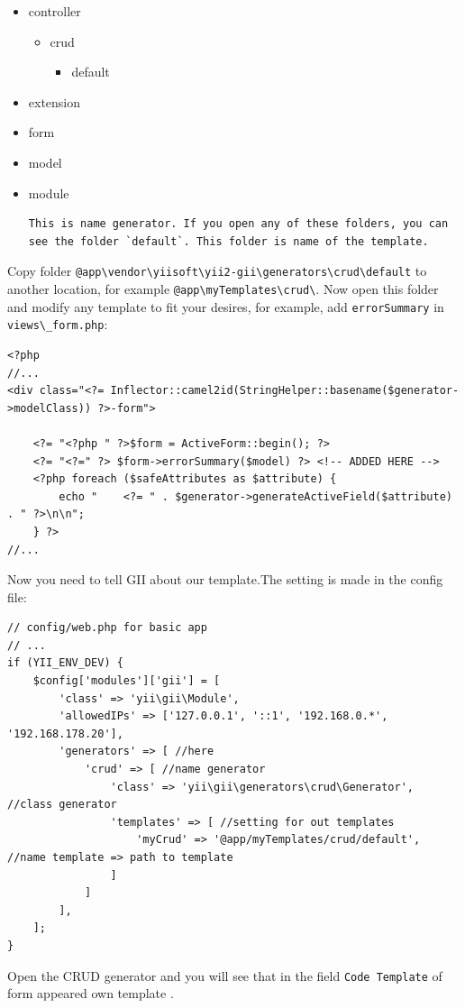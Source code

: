 \begin{itemize}
\item controller\begin{itemize}
\item crud\begin{itemize}
\item default
\end{itemize}

\end{itemize}

\item extension
\item form
\item model
\item module\begin{lstlisting}
This is name generator. If you open any of these folders, you can see the folder `default`. This folder is name of the template.
\end{lstlisting}

\end{itemize}
Copy folder \lstinline|@app\vendor\yiisoft\yii2-gii\generators\crud\default| to another location, for example \lstinline|@app\myTemplates\crud\|.
Now open this folder and modify any template to fit your desires, for example, add \lstinline|errorSummary| in \lstinline|views\_form.php|:

\lstset{language=php}\begin{lstlisting}
<?php
//...
<div class="<?= Inflector::camel2id(StringHelper::basename($generator->modelClass)) ?>-form">

    <?= "<?php " ?>$form = ActiveForm::begin(); ?>
    <?= "<?=" ?> $form->errorSummary($model) ?> <!-- ADDED HERE -->
    <?php foreach ($safeAttributes as $attribute) {
        echo "    <?= " . $generator->generateActiveField($attribute) . " ?>\n\n";
    } ?>
//...
\end{lstlisting}
Now you need to tell GII about our template.The setting is made in the config file:

\lstset{language=php}\begin{lstlisting}
// config/web.php for basic app
// ...
if (YII_ENV_DEV) {    
    $config['modules']['gii'] = [
        'class' => 'yii\gii\Module',      
        'allowedIPs' => ['127.0.0.1', '::1', '192.168.0.*', '192.168.178.20'],  
        'generators' => [ //here
            'crud' => [ //name generator
                'class' => 'yii\gii\generators\crud\Generator', //class generator
                'templates' => [ //setting for out templates
                    'myCrud' => '@app/myTemplates/crud/default', //name template => path to template
                ]
            ]
        ],
    ];
}
\end{lstlisting}
Open the CRUD generator and you will see that in the field \lstinline|Code Template| of form appeared own template .

